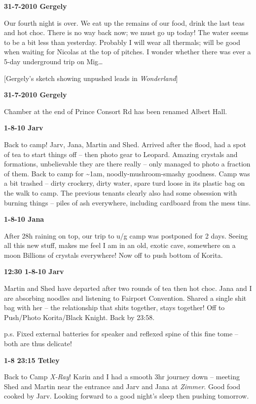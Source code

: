 \textbf{31-7-2010 Gergely}

Our fourth night is over. We eat up the remains of our food, drink the
last teas and hot choc. There is no way back now; we must go up today!
The water seems to be a bit less than yesterday. Probably I will wear
all thermals; will be good when waiting for Nicolas at the top of
pitches. I wonder whether there was ever a 5-day underground trip on
Mig\ldots{}

{[}Gergely's sketch showing unpushed leads in \emph{Wonderland}{]}

\textbf{31-7-2010 Gergely}

Chamber at the end of Prince Consort Rd has been renamed Albert Hall.

\textbf{1-8-10 Jarv}

Back to camp! Jarv, Jana, Martin and Shed. Arrived after the flood, had
a spot of tea to start things off -- then photo gear to Leopard. Amazing
crystals and formations, unbelievable they are there really -- only
managed to photo a fraction of them. Back to camp for
\textasciitilde{}1am, noodly-mushroom-smashy goodness. Camp was a bit
trashed -- dirty crockery, dirty water, spare turd loose in its plastic
bag on the walk to camp. The previous tenants clearly also had some
obsession with burning things -- piles of ash everywhere, including
cardboard from the mess tins.

\textbf{1-8-10 Jana}

After 28h raining on top, our trip to u/g camp was postponed for 2 days.
Seeing all this new stuff, makes me feel I am in an old, exotic cave,
somewhere on a moon Billions of crystals everywhere! Now off to push
bottom of Korita.

\textbf{12:30 1-8-10 Jarv}

Martin and Shed have departed after two rounds of tea then hot choc.
Jana and I are absorbing noodles and listening to Fairport Convention.
Shared a single shit bag with her -- the relationship that shits
together, stays together! Off to Push/Photo Korita/Black Knight. Back by
23:58.

p.s. Fixed external batteries for speaker and reflexed spine of this
fine tome -- both are thus delicate!

\textbf{1-8 23:15 Tetley}

Back to Camp \emph{X-Ray}! Karin and I had a smooth 3hr journey down --
meeting Shed and Martin near the entrance and Jarv and Jana at
\emph{Zimmer}. Good food cooked by Jarv. Looking forward to a good
night's sleep then pushing tomorrow.

